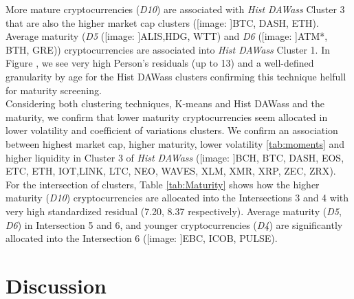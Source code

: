 \documentclass{bmcart}
\def\texttt{[image: ]}
\begin{document}
More mature cryptocurrencies (\textit{D10}) are associated with \textit{Hist DAWass} Cluster 3 that are also the higher market cap clusters (\texttt{BTC, DASH, ETH}). Average maturity (\textit{D5} (\texttt{ALIS,HDG, WTT}) and \textit{D6} (\texttt{ATM*, BTH, GRE})) cryptocurrencies are associated into \textit{Hist DAWass} Cluster 1. In Figure , we see very high Person's residuals (up to 13) and a well-defined granularity by age for the Hist DAWass clusters confirming this technique helfull for maturity screening. \\

Considering both clustering techniques, K-means and Hist DAWass and the maturity, we confirm that lower maturity cryptocurrencies seem allocated in lower volatility and coefficient of variations clusters. We confirm an association between highest market cap, higher maturity, lower volatility \ref{tab:moments} and higher liquidity in Cluster 3 of \textit{Hist DAWass} (\texttt{BCH, BTC, DASH, EOS, ETC, ETH, IOT,LINK, LTC, NEO, WAVES, XLM, XMR, XRP, ZEC, ZRX}). \\

For the intersection of clusters,  Table \ref{tab:Maturity} shows how the higher maturity (\textit{D10}) cryptocurrencies are allocated into the Intersections 3 and 4 with very high standardized residual (7.20, 8.37 respectively). Average maturity (\textit{D5}, \textit{D6}) in Intersection 5 and 6, and younger cryptocurrencies (\textit{D4}) are significantly allocated into the Intersection 6 (\texttt{EBC, ICOB, PULSE}).



\section*{Discussion}
\end{document}
